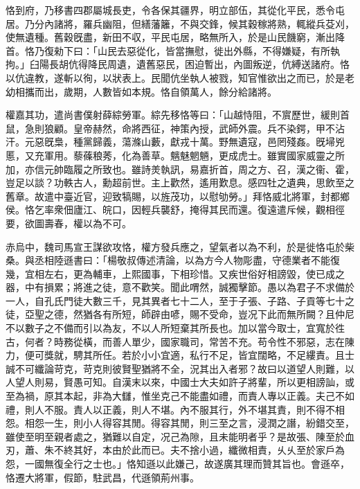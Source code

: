 \begin{pinyinscope}
 
 
 
 恪到府，乃移書四郡屬城長吏，令各保其疆界，明立部伍，其從化平民，悉令屯居。乃分內諸將，羅兵幽阻，但繕藩籬，不與交鋒，候其穀稼將熟，輒縱兵芟刈，使無遺種。舊穀旣盡，新田不収，平民屯居，略無所入，於是山民饑窮，漸出降首。恪乃復勑下曰：「山民去惡從化，皆當撫慰，徙出外縣，不得嫌疑，有所執拘。」臼陽長胡伉得降民周遺，遺舊惡民，困迫暫出，內圖叛逆，伉縛送諸府。恪以伉違教，遂斬以徇，以狀表上。民聞伉坐執人被戮，知官惟欲出之而已，於是老幼相攜而出，歲期，人數皆如本規。恪自領萬人，餘分給諸將。
 
 
 
 
 權嘉其功，遣尚書僕射薛綜勞軍。綜先移恪等曰：「山越恃阻，不賔歷世，緩則首鼠，急則狼顧。皇帝赫然，命將西征，神策內授，武師外震。兵不染鍔，甲不沾汗。元惡旣梟，種黨歸義，蕩滌山藪，獻戎十萬。野無遺寇，邑罔殘姦。旣埽兇慝，又充軍用。藜蓧稂莠，化為善草。魑魅魍魎，更成虎士。雖實國家威靈之所加，亦信元帥臨履之所致也。雖詩羙執訊，易嘉折首，周之方、召，漢之衞、霍，豈足以談？功軼古人，勳超前世。主上歡然，遙用歎息。感四牡之遺典，思飲至之舊章。故遣中臺近官，迎致犒賜，以旌茂功，以慰劬勞。」拜恪威北將軍，封都鄉侯。恪乞率衆佃廬江、皖口，因輕兵襲舒，掩得其民而還。復遠遣斥候，觀相徑要，欲圖壽春，權以為不可。
 
 
 
 
 赤烏中，魏司馬宣王謀欲攻恪，權方發兵應之，望氣者以為不利，於是徙恪屯於柴桑。與丞相陸遜書曰：「楊敬叔傳述清論，以為方今人物彫盡，守德業者不能復幾，宜相左右，更為輔車，上熙國事，下相珍惜。又疾世俗好相謗毀，使已成之器，中有損累；將進之徒，意不歡笑。聞此喟然，誠獨擊節。愚以為君子不求備於一人，自孔氏門徒大數三千，見其異者七十二人，至于子張、子路、子貢等七十之徒，亞聖之德，然猶各有所短，師辟由喭，賜不受命，豈况下此而無所闕？且仲尼不以數子之不備而引以為友，不以人所短棄其所長也。加以當今取士，宜寬於徃古，何者？時務從橫，而善人單少，國家職司，常苦不充。苟令性不邪惡，志在陳力，便可獎就，騁其所任。若於小小宜適，私行不足，皆宜闊略，不足縷責。且士誠不可纖論苛克，苛克則彼賢聖猶將不全，況其出入者邪？故曰以道望人則難，以人望人則易，賢愚可知。自漢末以來，中國士大夫如許子將輩，所以更相謗訕，或至為禍，原其本起，非為大讎，惟坐克己不能盡如禮，而責人專以正義。夫己不如禮，則人不服。責人以正義，則人不堪。內不服其行，外不堪其責，則不得不相怨。相怨一生，則小人得容其閒。得容其閒，則三至之言，浸潤之譖，紛錯交至，雖使至明至親者處之，猶難以自定，况己為隙，且未能明者乎？是故張、陳至於血刃，蕭、朱不終其好，本由於此而已。夫不捨小過，纖微相責，乆乆至於家戶為怨，一國無復全行之士也。」恪知遜以此嫌己，故遂廣其理而贊其旨也。會遜卒，恪遷大將軍，假節，駐武昌，代遜領荊州事。
 

\end{pinyinscope}
